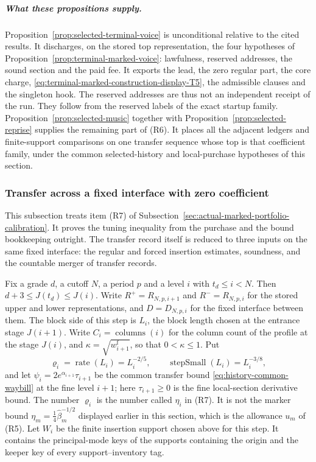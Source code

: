 \subparagraph{What these propositions supply.}
Proposition~\ref{prop:selected-terminal-voice} is unconditional relative
to the cited results. It discharges, on the stored top representation,
the four hypotheses of Proposition~\ref{prop:terminal-marked-voice}:
lawfulness, reserved addresses, the sound section and the paid fee. It
exports the lead, the zero regular part, the core charge, \eqref{eq:terminal-marked-construction-display-T5}, the
admissible clauses and the singleton hook. The reserved addresses are thus
not an independent receipt of the run. They follow from the reserved
labels of the exact startup family. Proposition~\ref{prop:selected-music}
together with Proposition~\ref{prop:selected-reprise} supplies the
remaining part of (R6). It places all the adjacent ledgers and
finite-support comparisons on one transfer sequence whose top is that coefficient family, under
the common selected-history and local-purchase hypotheses of this section.

\subsubsection{Transfer across a fixed interface with zero coefficient}
\label{sec:selected-zero-coordinate-coupon}

This subsection treats item (R7) of
Subsection~\ref{sec:actual-marked-portfolio-calibration}. It proves the
tuning inequality from the purchase and the bound bookkeeping
outright. The transfer record itself is reduced to three inputs on the same
fixed interface: the regular and forced insertion estimates, soundness,
and the countable merger of transfer records.

Fix a grade $d$, a cutoff $N$, a period $p$ and a level $i$ with
$t_d\le i<N$. Then $d+3\le J(t_d)\le J(i)$. Write
$R^+=R_{N,p,i+1}$ and $R^-=R_{N,p,i}$ for the stored upper and lower
representations, and $D=D_{N,p,i}$ for the fixed interface between them.
The block side of this step is $L_i$, the block length chosen at the
entrance stage $J(i+1)$. Write $C_i=\operatorname{columns}(i)$ for the
column count of the profile at the stage $J(i)$, and
$\kappa=\sqrt{w^{\mathrm f}_{i+1}}$, so that $0<\kappa\le1$. Put
\[
 \varrho_i=\operatorname{rate}(L_i)=L_i^{-2/5},\qquad
 \operatorname{stepSmall}(L_i)=L_i^{-3/8},
\]
and let $\psi_i=2e^{\alpha_{i+1}}\tau_{i+1}$ be the common transfer bound
\eqref{eq:history-common-waybill} at the fine level $i+1$; here
$\tau_{i+1}\ge0$ is the fine local-section derivative bound. The number
$\varrho_i$ is the number called $\eta_i$ in (R7). It is not the marker
bound $\eta_m=\tfrac14\widehat\beta_m^{-1/2}$ displayed earlier in this
section, which is the allowance $u_m$ of (R5). Let $W_i$ be the finite
insertion support chosen above for this step. It contains the principal-mode keys of
the supports containing the origin and the keeper key of every
support--inventory tag.

